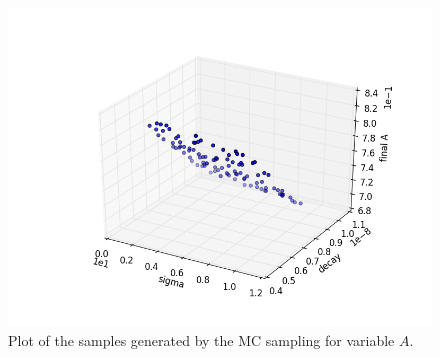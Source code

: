 \begin{figure}[h!]
  \centering
  \includegraphics[scale=0.7]{../../tests/framework/user_guide/ravenTutorial/gold/MonteCarlo/1-samplesPlot_A_scatter.png}
  \caption{Plot of the samples generated by the MC sampling for variable $A$.}
  \label{fig:samplesMCPlotLine_A}
\end{figure}

\clearpage
